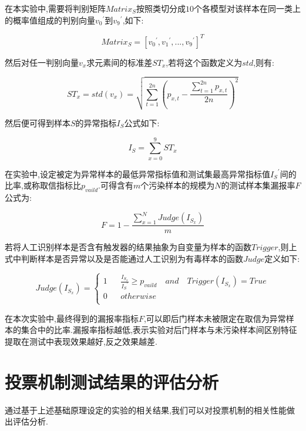在本实验中,需要将判别矩阵$Matrix_S$按照类切分成$10$个各模型对该样本在同一类上的概率值组成的判别向量${v_0}^{'}$到${v_9}^{'}$,如下:

\begin{equation}
Matrix_{S} = [{v_0}^{'},{v_1}^{'},...,{v_9}^{'}]^{T} 
\end{equation}

然后对任一判别向量${v_x}$求元素间的标准差${ST}_x$,若将这个函数定义为$std$,则有:

\begin{equation}
{ST}_x=std(v_x)=\sqrt{\sum_{t=1}^{2n} (p_{x,t}-\frac{\sum_{t=1}^{2n} p_{x,t}}{2n})^{2}} 
\end{equation}

然后便可得到样本$S$的异常指标$I_S$公式如下:

\begin{equation}
I_S=\sum_{x=0}^{9} {ST}_x 
\end{equation}

在实验中,设定被定为异常样本的最低异常指标值和测试集最高异常指标值${I_S}^{'}$间的比率,或称取信指标比$p_{vaild}$.可得含有$m$个污染样本的规模为$N$的测试样本集漏报率$F$公式为:

\begin{equation}
F=1-\frac{\sum_{x=1}^{N} Judge(I_{S_x})}{m} 
\end{equation}


若将人工识别样本是否含有触发器的结果抽象为自变量为样本的函数$Trigger$,则上式中判断样本是否异常以及是否能通过人工识别为有毒样本的函数$Judge$定义如下:

\begin{equation}
Judge(I_{S_x})=\left\{
\begin{array}{rcl}
1 && {\frac{I_{S_x}}{{I_S}^{'}} \geq p_{vaild} \quad and \quad Trigger(I_{S_x})=True}\\
0 && {otherwise}\\
\end{array}\right.
\end{equation}

在本次实验中,最终得到的漏报率指标$F$,可以即后门样本未被限定在取信为异常样本的集合中的比率.漏报率指标越低,表示实验对后门样本与未污染样本间区别特征提取在测试中表现效果越好,反之效果越差.

\section{投票机制测试结果的评估分析}
通过基于上述基础原理设定的实验的相关结果,我们可以对投票机制的相关性能做出评估分析.

